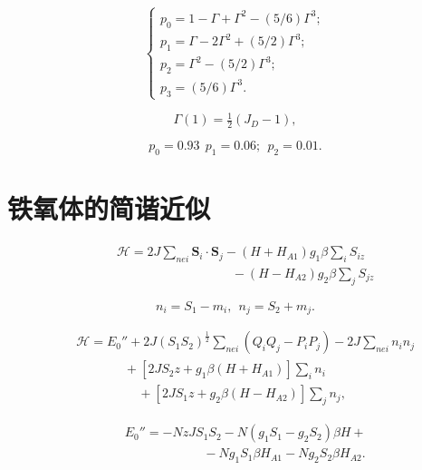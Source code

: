 \documentclass{article}
\begin{document}
\begin{equation} \label{eq:111}
\left\{
\begin{array}{l}
p_0=1-\Gamma+\Gamma^2-(5/6)\Gamma^3;\\
p_1=\Gamma-2\Gamma^2+(5/2)\Gamma^3;\\
p_2=\Gamma^2-(5/2)\Gamma^3;\\
p_3=(5/6)\Gamma^3.
\end{array}
\right.
\end{equation}

\begin{equation*}
\Gamma(1)=\tfrac{1}{2}(J_D-1),
\end{equation*}

\begin{equation} \label{eq:112}
p_0=0.93~~p_1=0.06;~~p_2=0.01.
\end{equation}



\section{铁氧体的简谐近似} \label{sec:9}


\begin{eqnarray} \label{eq:113}
&&\mathcal{H}=2J\sum\nolimits_{\mathit{nei}}\mathbf{S}_i\cdot\mathbf{S}_j-(H+H_{A1})g_1\beta\sum\nolimits_iS_{iz}\nonumber\\
&&~~~~~~~~~~~~~~~~~~~~~~~~~~~~~~~~~~~~~~~~~-(H-H_{A2})g_2\beta\sum\nolimits_jS_{jz}
\end{eqnarray}

\begin{equation} \label{eq:114}
n_i=S_1-m_i,~~n_j=S_2+m_j.
\end{equation} 

\begin{eqnarray} \label{eq:115}
&&\mathcal{H}=E_0''+2J(S_1S_2)^\frac{1}{2}\sum\nolimits_{\mathit{nei}}(Q_iQ_j-P_iP_j)-2J\sum\nolimits_\mathit{nei}n_in_j\nonumber\\
&&~~~~~~~~~~~~~~~~~+[2JS_2z+g_1\beta(H+H_{A1})]\sum\nolimits_in_i\nonumber\\
&&~~~~~~~~~~~~~~~~~~~~~~+[2JS_1z+g_2\beta(H-H_{A2})]\sum\nolimits_jn_j,
\end{eqnarray}

\begin{eqnarray} \label{eq:116}
&&E_0''=-NzJS_1S_2-N(g_1S_1-g_2S_2)\beta H+\nonumber\\
&&~~~~~~~~~~~~~~~~~~~~~~~~~~~~-Ng_1S_1\beta H_{A1}-Ng_2S_2\beta H_{A2}.
\end{eqnarray}
\end{document}
